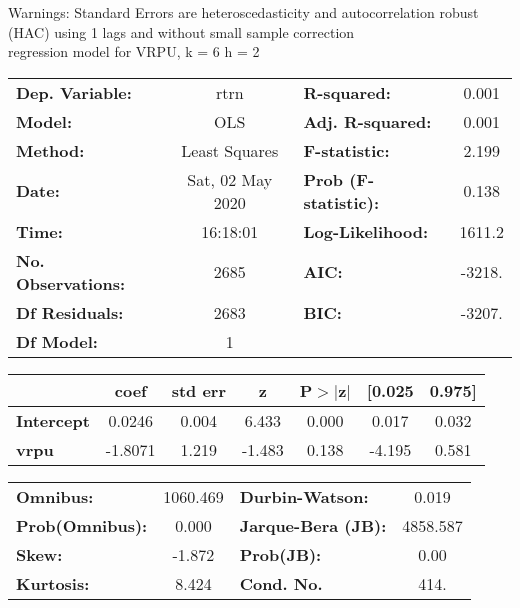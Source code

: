 Warnings: \newline
 [1] Standard Errors are heteroscedasticity and autocorrelation robust (HAC) using 1 lags and without small sample correction\\ 

regression model for VRPU, k = 6 h = 2\begin{center}
\begin{tabular}{lclc}
\toprule
\textbf{Dep. Variable:}    &       rtrn       & \textbf{  R-squared:         } &     0.001   \\
\textbf{Model:}            &       OLS        & \textbf{  Adj. R-squared:    } &     0.001   \\
\textbf{Method:}           &  Least Squares   & \textbf{  F-statistic:       } &     2.199   \\
\textbf{Date:}             & Sat, 02 May 2020 & \textbf{  Prob (F-statistic):} &    0.138    \\
\textbf{Time:}             &     16:18:01     & \textbf{  Log-Likelihood:    } &    1611.2   \\
\textbf{No. Observations:} &        2685      & \textbf{  AIC:               } &    -3218.   \\
\textbf{Df Residuals:}     &        2683      & \textbf{  BIC:               } &    -3207.   \\
\textbf{Df Model:}         &           1      & \textbf{                     } &             \\
\bottomrule
\end{tabular}
\begin{tabular}{lcccccc}
                   & \textbf{coef} & \textbf{std err} & \textbf{z} & \textbf{P$> |$z$|$} & \textbf{[0.025} & \textbf{0.975]}  \\
\midrule
\textbf{Intercept} &       0.0246  &        0.004     &     6.433  &         0.000        &        0.017    &        0.032     \\
\textbf{vrpu}      &      -1.8071  &        1.219     &    -1.483  &         0.138        &       -4.195    &        0.581     \\
\bottomrule
\end{tabular}
\begin{tabular}{lclc}
\textbf{Omnibus:}       & 1060.469 & \textbf{  Durbin-Watson:     } &    0.019  \\
\textbf{Prob(Omnibus):} &   0.000  & \textbf{  Jarque-Bera (JB):  } & 4858.587  \\
\textbf{Skew:}          &  -1.872  & \textbf{  Prob(JB):          } &     0.00  \\
\textbf{Kurtosis:}      &   8.424  & \textbf{  Cond. No.          } &     414.  \\
\bottomrule
\end{tabular}
\end{center}

